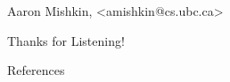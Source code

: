 \documentclass{beamer}
\title{}
\author{}
\institute{}
\date{}
\def\\{}%
\def\texttt#1{<#1>}%
\begin{document}
        \begin{frame}
        \vspace{1em}
        \begin{center}
            {\Large  \vspace{1em}} %


            {\large  \vspace{1em} } %

            {\large Aaron Mishkin, \\ \texttt{amishkin@cs.ubc.ca} } %
        \end{center}

        \vspace{2em}

        \begin{figure}
            \centering

        \end{figure}

    \end{frame}


    \begin{frame}{}

    \end{frame}



    \begin{frame}{}
        \begin{center}
        \huge Thanks for Listening!
        \end{center}
    \end{frame}

    \begin{frame}[allowframebreaks]{References}
        
        
    \end{frame}
\end{document}
